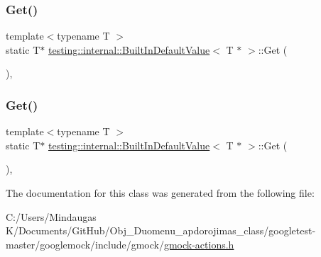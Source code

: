 \subsubsection{\texorpdfstring{Get()}{Get()}\hspace{0.1cm}{\footnotesize\ttfamily [2/3]}}
{\footnotesize\ttfamily template$<$typename T $>$ \\
static T$\ast$ \mbox{\hyperlink{classtesting_1_1internal_1_1_built_in_default_value}{testing\+::internal\+::\+Built\+In\+Default\+Value}}$<$ T $\ast$ $>$\+::Get (\begin{DoxyParamCaption}{ }\end{DoxyParamCaption})\hspace{0.3cm}{\ttfamily [inline]}, {\ttfamily [static]}}

\mbox{\label{classtesting_1_1internal_1_1_built_in_default_value_3_01_t_01_5_01_4_adc2fa2bdae767589d171ae3a117e3a9f}} 
\subsubsection{\texorpdfstring{Get()}{Get()}\hspace{0.1cm}{\footnotesize\ttfamily [3/3]}}
{\footnotesize\ttfamily template$<$typename T $>$ \\
static T$\ast$ \mbox{\hyperlink{classtesting_1_1internal_1_1_built_in_default_value}{testing\+::internal\+::\+Built\+In\+Default\+Value}}$<$ T $\ast$ $>$\+::Get (\begin{DoxyParamCaption}{ }\end{DoxyParamCaption})\hspace{0.3cm}{\ttfamily [inline]}, {\ttfamily [static]}}



The documentation for this class was generated from the following file\+:\begin{DoxyCompactItemize}
\item 
C\+:/\+Users/\+Mindaugas K/\+Documents/\+Git\+Hub/\+Obj\+\_\+\+Duomenu\+\_\+apdorojimas\+\_\+class/googletest-\/master/googlemock/include/gmock/\mbox{\hyperlink{googletest-master_2googlemock_2include_2gmock_2gmock-actions_8h}{gmock-\/actions.\+h}}\end{DoxyCompactItemize}
